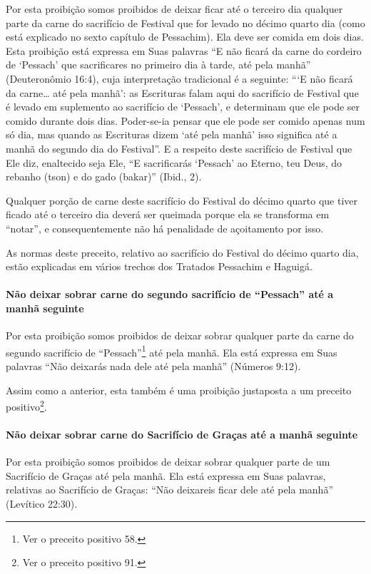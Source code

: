 Por esta proibição somos proibidos de deixar ficar até o terceiro dia
qualquer parte da carne do sacrifício de Festival que for levado no
décimo quarto dia (como está explicado no sexto capítulo de Pessachim).
Ela deve ser comida em dois dias. Esta proibição está expressa em Suas
palavras ``E não ficará da carne do cordeiro de `Pessach' que
sacrificares no primeiro dia à tarde, até pela manhã'' (Deuteronômio
16:4), cuja interpretação tradicional é a seguinte: ```E não ficará da
carne\ldots{} até pela manhã': as Escrituras falam aqui do sacrifício de
Festival que é levado em suplemento ao sacrifício de `Pessach', e
determinam que ele pode ser comido durante dois dias. Poder-se-ia pensar
que ele pode ser
comido apenas num só dia, mas quando as Escrituras dizem `até pela
manhã' isso significa até a manhã do segundo dia do Festival''. E a
respeito deste sacrifício de Festival que Ele diz, enaltecido seja Ele,
``E sacrificarás `Pessach' ao Eterno, teu Deus, do rebanho (tson) e do
gado (bakar)'' (Ibid., 2).

Qualquer porção de carne deste sacrifício do Festival do décimo quarto
que tiver ficado até o terceiro dia deverá ser queimada porque ela se
transforma em ``notar'', e consequentemente não há penalidade de
açoitamento por isso.

As normas deste preceito, relativo ao sacrifício do Festival do décimo
quarto dia, estão explicadas em vários trechos dos Tratados Pessachim e
Haguigá.

\paragraph{Não deixar sobrar carne do segundo sacrifício de
``Pessach'' até a manhã seguinte}

Por esta proibição somos proibidos de deixar sobrar qualquer parte da
carne do segundo sacrifício de ``Pessach''\footnote{Ver o preceito positivo 58.} até pela
manhã. Ela está expressa em Suas palavras ``Não deixarás nada dele até
pela manhã'' (Números 9:12).

Assim como a anterior, esta também é uma proibição justaposta a um
preceito positivo\footnote{Ver o preceito positivo 91.}.

\paragraph{Não deixar sobrar carne do Sacrifício de Graças até a manhã seguinte}

Por esta proibição somos proibidos de deixar sobrar qualquer parte de um
Sacrifício de Graças até pela manhã. Ela está expressa em Suas palavras,
relativas ao Sacrifício de Graças: ``Não deixareis ficar dele até pela
manhã'' (Levítico 22:30).

